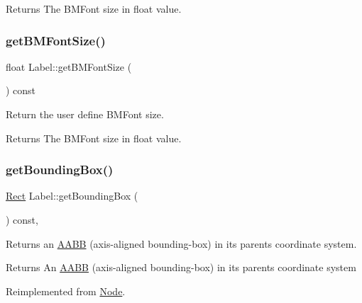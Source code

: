\begin{DoxyReturn}{Returns}
The B\+M\+Font size in float value. 
\end{DoxyReturn}
\mbox{\label{classLabel_a296763fd55fbde90fdec27bbc563a119}} 
\subsubsection{\texorpdfstring{get\+B\+M\+Font\+Size()}{getBMFontSize()}\hspace{0.1cm}{\footnotesize\ttfamily [2/2]}}
{\footnotesize\ttfamily float Label\+::get\+B\+M\+Font\+Size (\begin{DoxyParamCaption}{ }\end{DoxyParamCaption}) const}

Return the user define B\+M\+Font size.

\begin{DoxyReturn}{Returns}
The B\+M\+Font size in float value. 
\end{DoxyReturn}
\mbox{\label{classLabel_a05bcec134c3319eb75dc3fdebc1ab62e}} 
\subsubsection{\texorpdfstring{get\+Bounding\+Box()}{getBoundingBox()}\hspace{0.1cm}{\footnotesize\ttfamily [1/2]}}
{\footnotesize\ttfamily \hyperlink{classRect}{Rect} Label\+::get\+Bounding\+Box (\begin{DoxyParamCaption}{ }\end{DoxyParamCaption}) const\hspace{0.3cm}{\ttfamily [override]}, {\ttfamily [virtual]}}

Returns an \hyperlink{classAABB}{A\+A\+BB} (axis-\/aligned bounding-\/box) in its parent\textquotesingle{}s coordinate system.

\begin{DoxyReturn}{Returns}
An \hyperlink{classAABB}{A\+A\+BB} (axis-\/aligned bounding-\/box) in its parent\textquotesingle{}s coordinate system 
\end{DoxyReturn}


Reimplemented from \hyperlink{classNode_a7b3849315467fdb992b273fbd3b3fc66}{Node}.

